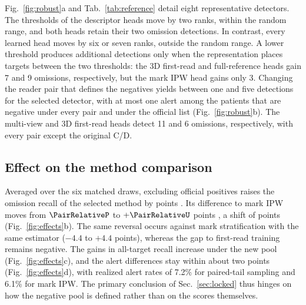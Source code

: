 Fig.~\ref{fig:robust}a and Tab.~\ref{tab:reference} detail eight representative detectors. The thresholds of the descriptor heads move by two ranks, within the random range, and both heads retain their two omission detections. In contrast, every learned head moves by six or seven ranks, outside the random range. A lower threshold produces additional detections only when the representation places targets between the two thresholds: the 3D first-read and full-reference heads gain 7 and 9 omissions, respectively, but the mark IPW head gains only 3. Changing the reader pair that defines the negatives yields between one and five detections for the selected detector, with at most one alert among the \RoleTest{} patients that are negative under every pair and under the official list (Fig.~\ref{fig:robust}b). The multi-view and 3D first-read heads detect 11 and 6 omissions, respectively, with every pair except the original C/D.

\begin{table}[t]
\centering\small
\setlength{\tabcolsep}{3pt}
\caption{\textbf{Fixed scores under two negative pools.} Each cell gives the count under the C/D cutoff $\to$ the count after excluding official-positive patients. Omit.: of 42 omissions; All: of 276 targets; Alert: of 90 common-negative test patients. Drop: cutoff drop in ranks of the original pool.}
\label{tab:reference}

\end{table}

\subsection{Effect on the method comparison}

Averaged over the six matched draws, excluding official positives raises the omission recall of the selected method by \PairChange{} points \PairChangeCI{}. Its difference to mark IPW moves from $\PairRelativeP$ to $+\PairRelativeU$ points \PairRelativeUCI{}, a shift of \ReferenceInteraction{} points \ReferenceInteractionCI{} (Fig.~\ref{fig:effects}b). The same reversal occurs against mark stratification with the same estimator ($-4.4$ to $+4.4$ points), whereas the gap to first-read training remains negative. The gains in all-target recall increase under the new pool (Fig.~\ref{fig:effects}c), and the alert differences stay within about two points (Fig.~\ref{fig:effects}d), with realized alert rates of 7.2\% for paired-tail sampling and 6.1\% for mark IPW. The primary conclusion of Sec.~\ref{sec:locked} thus hinges on how the negative pool is defined rather than on the scores themselves.


